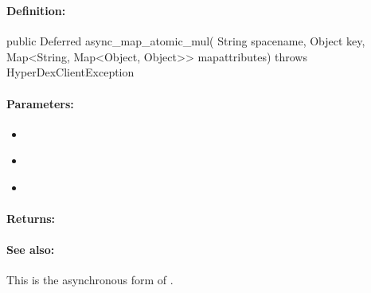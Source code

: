 \pagebreak
\subsubsection{}
\label{api:java:async_map_atomic_mul}


\paragraph{Definition:}
\begin{javacode}
public Deferred async_map_atomic_mul(
        String spacename,
        Object key,
        Map<String, Map<Object, Object>> mapattributes) throws HyperDexClientException
\end{javacode}

\paragraph{Parameters:}
\begin{itemize}[noitemsep]
\item {}\\

\item {}\\

\item {}\\

\end{itemize}

\paragraph{Returns:}


\paragraph{See also:}  This is the asynchronous form of .

\pagebreak
\subsubsection{}
\label{api:java:cond_map_atomic_mul}


